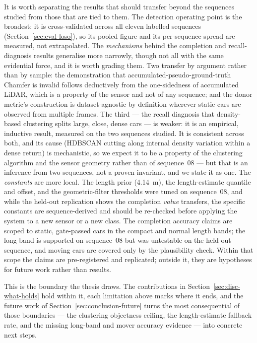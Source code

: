 It is worth separating the results that should transfer beyond the sequences studied
from those that are tied to them. The detection operating point is the broadest: it is
cross-validated across all eleven labelled sequences (Section~\ref{sec:eval-loso}), so its
pooled figure and its per-sequence spread are measured, not extrapolated. The
\emph{mechanisms} behind the completion and recall-diagnosis results generalise more
narrowly, though not all with the same evidential force, and it is worth grading them. Two transfer by argument rather
than by sample: the demonstration that accumulated-pseudo-ground-truth Chamfer is invalid
follows deductively from the one-sidedness of accumulated LiDAR, which is a property of the
sensor and not of any sequence; and the donor metric's construction is dataset-agnostic by
definition wherever static cars are observed from multiple frames. The third --- the recall
diagnosis that density-based clustering splits large, close, dense cars --- is weaker: it
is an empirical, inductive result, measured on the two sequences studied. It is consistent
across both, and its cause (HDBSCAN cutting along internal density variation within a dense
return) is mechanistic, so we expect it to be a property of the clustering algorithm and
the sensor geometry rather than of sequence~08 --- but that is an inference from two
sequences, not a proven invariant, and we state it as one. The \emph{constants} are more
local. The length prior (\SI{4.14}{\metre}), the length-estimate
quantile and offset, and the geometric-filter thresholds were tuned on sequence~08, and
while the held-out replication shows the completion \emph{value} transfers, the specific
constants are sequence-derived and should be re-checked before applying the system to a new
sensor or a new class. The completion accuracy claims are scoped to static, gate-passed
cars in the compact and normal length bands; the long band is supported on sequence~08 but
was untestable on the held-out sequence, and moving cars are covered only by the
plausibility check. Within that scope the claims are pre-registered and replicated; outside
it, they are hypotheses for future work rather than results.

This is the boundary the thesis draws. The contributions in
Section~\ref{sec:disc-what-holds} hold within it, each limitation above marks where it
ends, and the future work of Section~\ref{sec:conclusion-future} turns the most
consequential of those boundaries --- the clustering
objectness ceiling, the length-estimate fallback rate, and the missing long-band and
mover accuracy evidence --- into concrete next steps.
